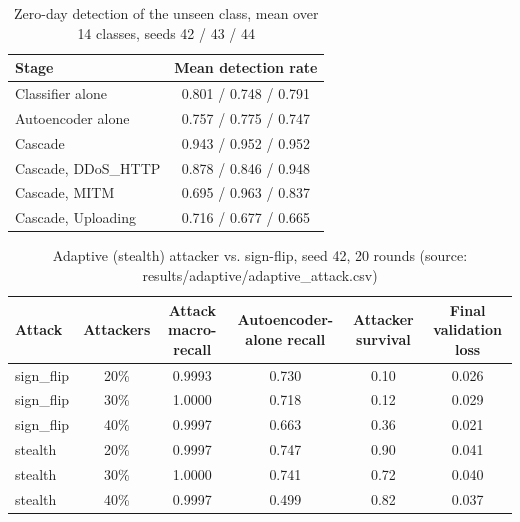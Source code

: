 \begin{table}[H]
\centering
\small
\setlength{\tabcolsep}{3pt}
\renewcommand{\arraystretch}{1.15}
\begin{tabular}{|l|c|}
\hline
\textbf{Stage} & \textbf{Mean detection rate} \\ \hline
Classifier alone & 0.801 / 0.748 / 0.791 \\ \hline
Autoencoder alone & 0.757 / 0.775 / 0.747 \\ \hline
Cascade & 0.943 / 0.952 / 0.952 \\ \hline
Cascade, DDoS\_HTTP & 0.878 / 0.846 / 0.948 \\ \hline
Cascade, MITM & 0.695 / 0.963 / 0.837 \\ \hline
Cascade, Uploading & 0.716 / 0.677 / 0.665 \\ \hline
\end{tabular}
\caption{Zero-day detection of the unseen class, mean over 14 classes, seeds 42 / 43 / 44}
\label{tab:fu_seed_zeroday}
\end{table}

\begin{table}[H]
\centering
\scriptsize
\setlength{\tabcolsep}{3pt}
\renewcommand{\arraystretch}{1.15}
\begin{tabular}{|l|c|c|c|c|c|}
\hline
\textbf{Attack} & \textbf{Attackers} & \textbf{Attack macro-recall} & \textbf{Autoencoder-alone recall} & \textbf{Attacker survival} & \textbf{Final validation loss} \\ \hline
sign\_flip & 20\% & 0.9993 & 0.730 & 0.10 & 0.026 \\ \hline
sign\_flip & 30\% & 1.0000 & 0.718 & 0.12 & 0.029 \\ \hline
sign\_flip & 40\% & 0.9997 & 0.663 & 0.36 & 0.021 \\ \hline
stealth & 20\% & 0.9997 & 0.747 & 0.90 & 0.041 \\ \hline
stealth & 30\% & 1.0000 & 0.741 & 0.72 & 0.040 \\ \hline
stealth & 40\% & 0.9997 & 0.499 & 0.82 & 0.037 \\ \hline
\end{tabular}
\caption{Adaptive (stealth) attacker vs. sign-flip, seed 42, 20 rounds (source: results/adaptive/adaptive\_attack.csv)}
\label{tab:fu_adaptive}
\end{table}

